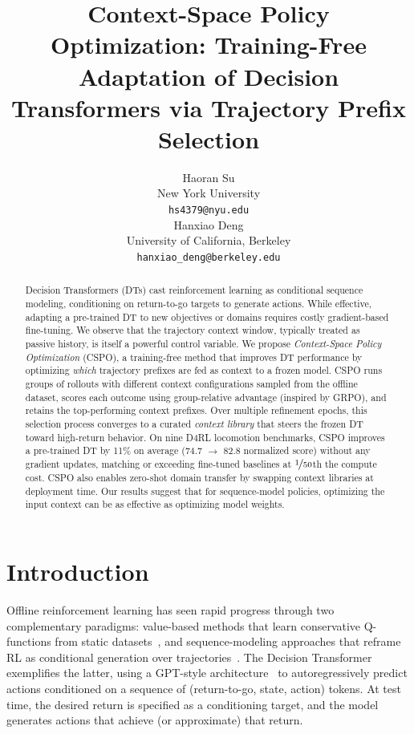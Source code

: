 \documentclass{article}
\title{Context-Space Policy Optimization: Training-Free Adaptation of Decision Transformers via Trajectory Prefix Selection}
\author{
  Haoran Su \\
  New York University \\
  \texttt{hs4379@nyu.edu} \\
  \And
  Hanxiao Deng \\
  University of California, Berkeley \\
  \texttt{hanxiao\_deng@berkeley.edu} \\
}
\newcommand{\cspo}{\textsc{CSPO}}
\begin{document}
\maketitle

\begin{abstract}
Decision Transformers (DTs) cast reinforcement learning as conditional sequence modeling, conditioning on return-to-go targets to generate actions. While effective, adapting a pre-trained DT to new objectives or domains requires costly gradient-based fine-tuning. We observe that the trajectory context window, typically treated as passive history, is itself a powerful control variable. We propose \emph{Context-Space Policy Optimization} (\cspo{}), a training-free method that improves DT performance by optimizing \emph{which} trajectory prefixes are fed as context to a frozen model. \cspo{} runs groups of rollouts with different context configurations sampled from the offline dataset, scores each outcome using group-relative advantage (inspired by GRPO), and retains the top-performing context prefixes. Over multiple refinement epochs, this selection process converges to a curated \emph{context library} that steers the frozen DT toward high-return behavior. On nine D4RL locomotion benchmarks, \cspo{} improves a pre-trained DT by 11\% on average (74.7 $\to$ 82.8 normalized score) without any gradient updates, matching or exceeding fine-tuned baselines at $\nicefrac{1}{50}$th the compute cost. \cspo{} also enables zero-shot domain transfer by swapping context libraries at deployment time. Our results suggest that for sequence-model policies, optimizing the input context can be as effective as optimizing model weights.
\end{abstract}

\section{Introduction}
\label{sec:intro}

Offline reinforcement learning has seen rapid progress through two complementary paradigms: value-based methods that learn conservative Q-functions from static datasets~\citep{kumar2020conservative, kostrikov2022offline, fujimoto2019off}, and sequence-modeling approaches that reframe RL as conditional generation over trajectories~\citep{chen2021decision, janner2021offline, janner2022planning}. The Decision Transformer~\citep{chen2021decision} exemplifies the latter, using a GPT-style architecture~\citep{radford2019language} to autoregressively predict actions conditioned on a sequence of (return-to-go, state, action) tokens. At test time, the desired return is specified as a conditioning target, and the model generates actions that achieve (or approximate) that return.
\end{document}
